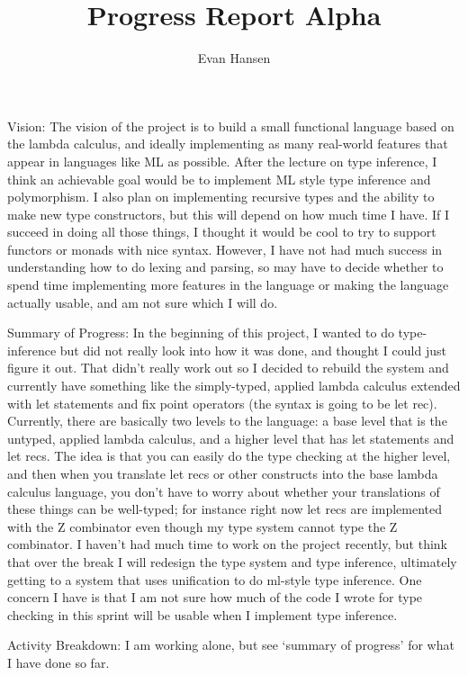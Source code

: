 \documentclass{article}
\begin{document}
\title{Progress Report Alpha}
\author{Evan Hansen}
\maketitle
Vision:
The vision of the project is to build a small functional language based on the lambda calculus, and ideally implementing as many real-world features that appear in languages like ML as possible.
After the lecture on type inference, I think an achievable goal would be to implement ML style type inference and polymorphism.
I also plan on implementing recursive types and the ability to make new type constructors, but this will depend on how much time I have.
If I succeed in doing all those things, I thought it would be cool to try to support functors or monads with nice syntax.
However, I have not had much success in understanding how to do lexing and parsing, so may have to decide whether to spend time implementing more features in the language or making the language actually usable, and am not sure which I will do.

Summary of Progress:
In the beginning of this project, I wanted to do type-inference but did not really look into how it was done, and thought I could just figure it out.
That didn't really work out so I decided to rebuild the system and currently have something like the simply-typed, applied lambda calculus extended with let statements and fix point operators (the syntax is going to be let rec).
Currently, there are basically two levels to the language: a base level that is the untyped, applied lambda calculus, and a higher level that has let statements and let recs.
The idea is that you can easily do the type checking at the higher level, and then when you translate let recs or other constructs into the base lambda calculus language, you don't have to worry about whether your translations of these things can be well-typed; for instance right now let recs are implemented with the Z combinator even though my type system cannot type the Z combinator.
I haven't had much time to work on the project recently, but think that over the break I will redesign the type system and type inference, ultimately getting to a system that uses unification to do ml-style type inference.
One concern I have is that I am not sure how much of the code I wrote for type checking in this sprint will be usable when I implement type inference.

Activity Breakdown:
I am working alone, but see `summary of progress' for what I have done so far.
\end{document}
